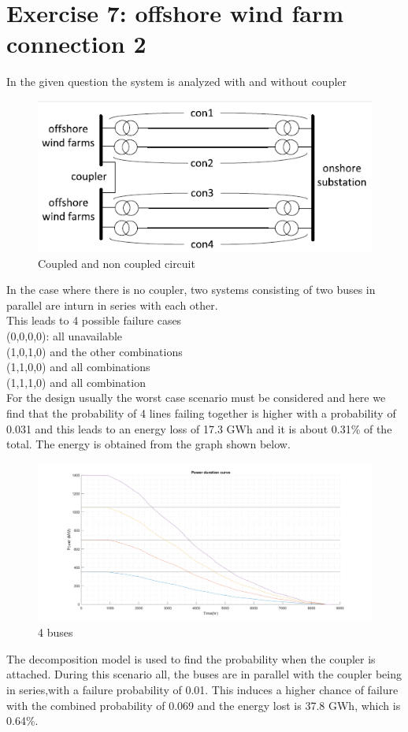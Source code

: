 \section*{\textbf{Exercise 7: offshore wind farm connection 2}}
In the given question the system is analyzed with and without coupler 
\begin{figure}[h!]
    \centering
        \includegraphics[width=0.8 \linewidth]{Coupler.PNG}
        \caption{Coupled and non coupled circuit}
        \label{fig:coupler}
\end{figure}
In the case where there is no coupler, two systems consisting of two buses in parallel are inturn in series with each other.\\
This leads to 4 possible failure cases\\
(0,0,0,0): all unavailable\\
(1,0,1,0) and the other combinations\\
(1,1,0,0) and all combinations\\
(1,1,1,0) and all combination\\
For the design usually the worst case scenario must be considered and here we find that the probability of 4 lines failing together is higher with a probability of 0.031 and this leads to an energy loss of 17.3 GWh and it is about 0.31\% of the total. The energy is obtained from the graph shown below.
\begin{figure}[h!]
    \centering
        \includegraphics[width=0.8 \linewidth]{4_PDC.png}
        \caption{4 buses}
        \label{fig:couple}
\end{figure}
The decomposition model is used to find the probability when the coupler is attached. During this scenario all, the buses are in parallel with the coupler being in series,with a failure probability of 0.01. This induces a higher chance of failure with the combined probability of
0.069 and the energy lost is 37.8 GWh, which is  0.64\%.

